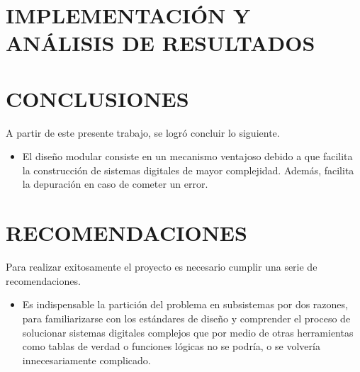 \documentclass[journal,trans]{IEEEtran}
\begin{document}
\section{IMPLEMENTACIÓN Y ANÁLISIS DE RESULTADOS}


\section{CONCLUSIONES}
A partir de este presente trabajo, se logró concluir lo siguiente.
\begin{itemize}
    \item El diseño modular consiste en un mecanismo ventajoso debido a que facilita la construcción de sistemas digitales de mayor complejidad. Además, facilita la depuración en caso de cometer un error.
\end{itemize}

\section{RECOMENDACIONES}
Para realizar exitosamente el proyecto es necesario cumplir una serie de recomendaciones.
\begin{itemize}
    \item Es indispensable la partición del problema en subsistemas por dos razones, para familiarizarse con los estándares de diseño y comprender el proceso de solucionar sistemas digitales complejos que por medio de otras herramientas como tablas de verdad o funciones lógicas no se podría, o se volvería innecesariamente complicado.
\end{itemize}




\begin{comment}

Ejemplos:

\begin{table}[htb]
  \begin{center}
    \caption{Filter bank's output's STD error per band for an impulsive input signal, tested against BeagleBoard's output for the same input signal. Worst case is band 5, close to a 4\% STD error.}
    \label{tab:filter-error}
    \begin{tabular}{c | c | c | c | c | c }
      \hline
      Band & 1 & 2 & 3 & 4 & 5 \\
      \hline
       STD & 0.0090 & 0.0097 & 0.0166 & 0.0291 & 0.0389 \\
      \hline
    \end{tabular}
  \end{center}
\end{table}


\begin{figure}[hbtp]
	\centering
	\texttt{[image: Imagenes/ALU]}
	\caption[]{Sample of results from bands 1 and 8 from the Verilog version of the filter bank, compared against data from the BeagleBoard's filter version.}
	\label{fig:FiguraCircuito}
\end{figure}

\end{comment}
\end{document}
